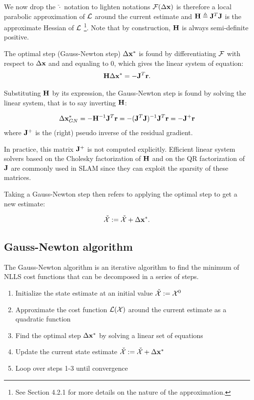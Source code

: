 We now drop the $\check{\cdot}$ notation to lighten notations $\mathcal{F}(\Delta {\bf x})$ is therefore a local parabolic approximation of 
$\mathcal{L}$ around the current estimate and ${\bf H} \triangleq {\bf J}^T {\bf J}$ is the approximate Hessian of $\mathcal{L}$ 
\footnote{See \cite{sola2017course} Section 4.2.1 for more details on the nature of the approximation.}. Note that by construction, ${\bf H}$ is always 
semi-definite positive.

The optimal step (Gauss-Newton step) $\Delta {\bf x}^*$ is found by differentiating $\mathcal{F}$ with respect to $\Delta {\bf x}$ and and equaling to 0,
which gives the linear system of equation:
\begin{equation}
    \bfH \Delta \bfx^* = - \bfJ^T \bfr.%
    \label{eq:linear_syst_GN}
\end{equation}

Substituting ${\bf H}$ by its expression, the Gauss-Newton step is found by solving the linear system, that is to say inverting ${\bf H}$:

\begin{equation*}
    \Delta {\bf x}_{GN}^* = - {\bf H}^{-1} {\bf J}^T {\bf r} = - ({\bf J}^T {\bf J})^{-1} {\bf J}^T {\bf r} = -  {\bf J}^{+} {\bf r}
\end{equation*}
where ${\bf J}^{+}$ is the (right) pseudo inverse of the residual gradient. 

In practice, this matrix ${\bf J}^{+}$ is not computed explicitly. Efficient linear system solvers based on the Cholesky
factorization of ${\bf H}$ and on the QR factorization of ${\bf J}$ are commonly used in SLAM since they can exploit the sparsity of these
matrices.

Taking a Gauss-Newton step then refers to applying the optimal step to get a new estimate:

\begin{equation}
    \check{\mathcal{X}} := \check{\mathcal{X}} + \Delta {\bf x}^*.
    \label{eq:gaussian_step}
\end{equation}


\subsection{Gauss-Newton algorithm}
The Gauss-Newton algorithm is an iterative algorithm to find the minimum of NLLS cost functions that can be decomposed in a series of steps.
\begin{enumerate}
    \item Initialize the state estimate at an initial value $\check{\mathcal{X}} := \mathcal{X}^0$
    \item Approximate the cost function $\mathcal{L}(\mathcal{X})$ around the current estimate as a quadratic function
    \item Find the optimal step $\Delta {\bf x}^*$ by solving a linear set of equations 
    \item Update the current state estimate $\check{\mathcal{X}} := \check{\mathcal{X}} + \Delta {\bf x}^*$
    \item Loop over steps 1-3 until convergence
\end{enumerate}




